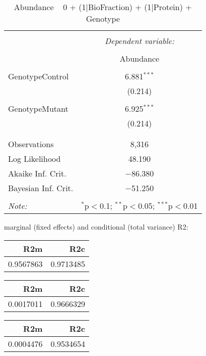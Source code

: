 \documentclass[11pt]{report}
\begin{document}
\begin{table}[!htbp] \centering 
  \caption{Abundance ~ 0 + (1|BioFraction) + (1|Protein) + Genotype} 
  \label{} 
\begin{tabular}{@{\extracolsep{5pt}}lc} 
\\[-1.8ex]\hline 
\hline \\[-1.8ex] 
 & \multicolumn{1}{c}{\textit{Dependent variable:}} \\ 
\cline{2-2} 
\\[-1.8ex] & Abundance \\ 
\hline \\[-1.8ex] 
 GenotypeControl & 6.881$^{***}$ \\ 
  & (0.214) \\ 
  & \\ 
 GenotypeMutant & 6.925$^{***}$ \\ 
  & (0.214) \\ 
  & \\ 
\hline \\[-1.8ex] 
Observations & 8,316 \\ 
Log Likelihood & 48.190 \\ 
Akaike Inf. Crit. & $-$86.380 \\ 
Bayesian Inf. Crit. & $-$51.250 \\ 
\hline 
\hline \\[-1.8ex] 
\textit{Note:}  & \multicolumn{1}{r}{$^{*}$p$<$0.1; $^{**}$p$<$0.05; $^{***}$p$<$0.01} \\ 
\end{tabular} 
\end{table} 
marginal (fixed effects) and conditional (total variance) R2:

\begin{tabular}{r|r}
\hline
R2m & R2c\\
\hline
0.9567863 & 0.9713485\\
\hline
\end{tabular}

\begin{tabular}{r|r}
\hline
R2m & R2c\\
\hline
0.0017011 & 0.9666329\\
\hline
\end{tabular}

\begin{tabular}{r|r}
\hline
R2m & R2c\\
\hline
0.0004476 & 0.9534654\\
\hline
\end{tabular}
\end{document}

